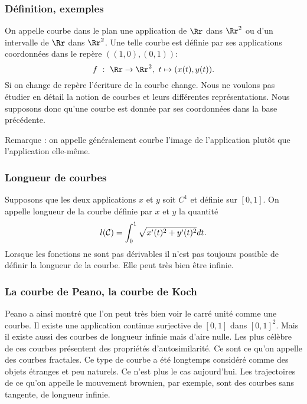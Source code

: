 \documentclass[12pt, class=report,crop=false]{standalone}
\begin{document}
\subsubsection{Définition, exemples}
On appelle courbe dans le plan une application de $\Rr$ dans $\Rr^2$ ou d'un intervalle de $\Rr$ dans $\Rr^2$. Une telle courbe est définie par ses applications coordonnées dans le rep\`ere $((1,0), (0,1))$:
$$
f\ :\ \Rr\rightarrow \Rr^2,\ t\mapsto (x(t),y(t)).
$$
Si on change de rep\`ere l'écriture de la courbe change. Nous ne voulons pas étudier en détail la notion de courbes et leurs différentes représentations. Nous supposons donc qu'une courbe est donnée par ses coordonnées dans la base précédente. 

Remarque : on appelle généralement courbe l'image de l'application plut\^ot que l'application elle-m\^eme.
 
\subsubsection{Longueur de courbes}
Supposons que les deux applications $x$ et $y$ soit $C^1$ et définie sur $[0,1]$. On appelle longueur de la courbe définie par $x$ et $y$ la quantité
$$
l({\cal C})=\int_0^1\sqrt{x'(t)^2+y'(t)^2} dt.
$$
Lorsque les fonctions ne sont pas dérivables il n'est pas toujours possible de définir la longueur de la courbe. Elle peut tr\`es bien \^etre infinie. 
\subsubsection{La courbe de Peano, la courbe de Koch}
Peano a ainsi montré que l'on peut tr\`es bien voir le carré unité comme une courbe. Il existe une application continue surjective de $[0,1]$ dans $[0,1]^2$. 
Mais il existe aussi des courbes de longueur infinie mais d'aire nulle. Les plus cél\`ebre de ces courbes présentent des propriétés d'autosimilarité. Ce sont ce qu'on appelle des courbes fractales.
Ce type de courbe a été longtemps considéré comme des objets étranges et peu naturels. Ce n'est plus le cas aujourd'hui. Les trajectoires de ce qu'on appelle le mouvement brownien, par exemple, sont des courbes sans tangente, de longueur infinie. 
\end{document}
